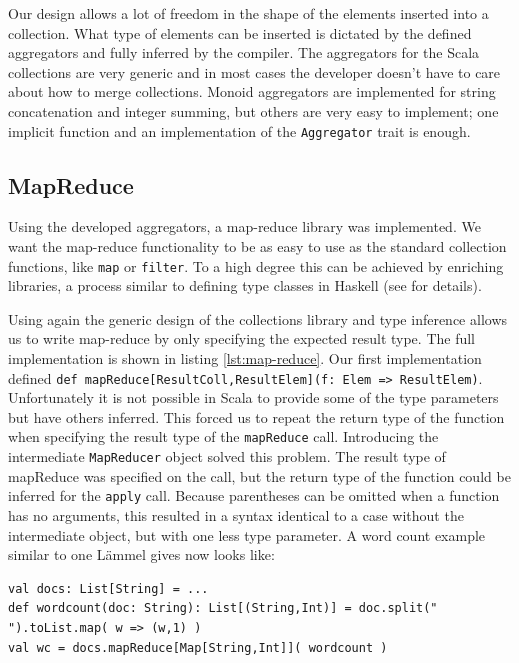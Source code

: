 \documentclass[10pt,a4paper]{article}
\begin{document}
Our design allows a lot of freedom in the shape of the elements inserted into a collection. What type of elements can be inserted is dictated by the defined aggregators and fully inferred by the compiler. The aggregators for the Scala collections are very generic and in most cases the developer doesn't have to care about how to merge collections. Monoid aggregators are implemented for string concatenation and integer summing, but others are very easy to implement; one implicit function and an implementation of the \lstinline|Aggregator| trait is enough.

\subsection{MapReduce}

Using the developed aggregators, a map-reduce library was implemented. We want the map-reduce functionality to be as easy to use as the standard collection functions, like \lstinline|map| or \lstinline|filter|. To a high degree this can be achieved by enriching libraries, a process similar to defining type classes in Haskell (see \cite{odersky2006pimp} for details).

Using again the generic design of the collections library and type inference allows us to write map-reduce by only specifying the expected result type. The full implementation is shown in listing \ref{lst:map-reduce}. Our first implementation defined \lstinline|def mapReduce[ResultColl,ResultElem](f: Elem => ResultElem)|. Unfortunately it is not possible in Scala to provide some of the type parameters but have others inferred. This forced us to repeat the return type of the function when specifying the result type of the \lstinline|mapReduce| call. Introducing the intermediate \lstinline|MapReducer| object solved this problem. The result type of mapReduce was specified on the call, but the return type of the function could be inferred for the \lstinline|apply| call. Because parentheses can be omitted when a function has no arguments, this resulted in a syntax identical to a case without the intermediate object, but with one less type parameter. A word count example similar to one L\"ammel gives now looks like:
\begin{lstlisting}
val docs: List[String] = ...
def wordcount(doc: String): List[(String,Int)] = doc.split(" ").toList.map( w => (w,1) )
val wc = docs.mapReduce[Map[String,Int]]( wordcount )
\end{lstlisting}
\end{document}
